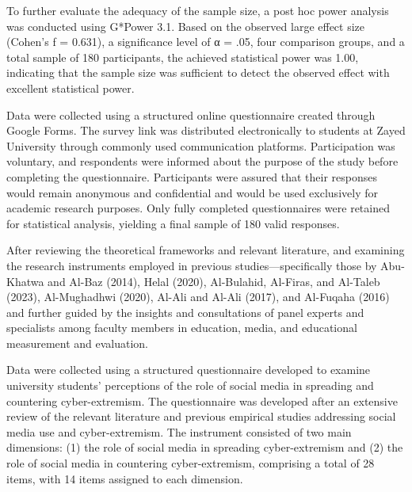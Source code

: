 \documentclass[10pt]{NSP1}
\begin{document}
To further evaluate the adequacy of the sample size, a post hoc power analysis was conducted using G*Power 3.1. Based on the observed large effect size (Cohen's f = 0.631), a significance level of α = .05, four comparison groups, and a total sample of 180 participants, the achieved statistical power was 1.00, indicating that the sample size was sufficient to detect the observed effect with excellent statistical power.

\par\medskip{}\smallskip

Data were collected using a structured online questionnaire created through Google Forms. The survey link was distributed electronically to students at Zayed University through commonly used communication platforms. Participation was voluntary, and respondents were informed about the purpose of the study before completing the questionnaire. Participants were assured that their responses would remain anonymous and confidential and would be used exclusively for academic research purposes. Only fully completed questionnaires were retained for statistical analysis, yielding a final sample of 180 valid responses.

\par\medskip{}\smallskip

After reviewing the theoretical frameworks and relevant literature, and examining the research instruments employed in previous studies—specifically those by Abu-Khatwa and Al-Baz (2014), Helal (2020), Al-Bulahid, Al-Firas, and Al-Taleb (2023), Al-Mughadhwi (2020), Al-Ali and Al-Ali (2017), and Al-Fuqaha (2016) and further guided by the insights and consultations of panel experts and specialists among faculty members in education, media, and educational measurement and evaluation.

Data were collected using a structured questionnaire developed to examine university students' perceptions of the role of social media in spreading and countering cyber-extremism. The questionnaire was developed after an extensive review of the relevant literature and previous empirical studies addressing social media use and cyber-extremism. The instrument consisted of two main dimensions: (1) the role of social media in spreading cyber-extremism and (2) the role of social media in countering cyber-extremism, comprising a total of 28 items, with 14 items assigned to each dimension.
\end{document}
